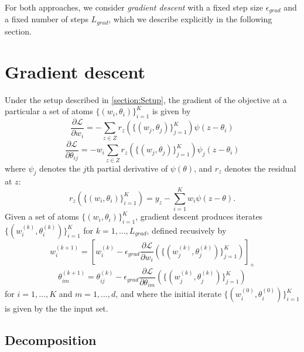 \documentclass[11pt]{article}
\begin{document}
For both approaches, we consider \emph{gradient descent} with a fixed
step size $\epsilon_{grad}$ and a fixed number of steps $L_{grad}$, which we
describe explicitly in the following section.

\section{Gradient descent}

Under the setup described in \ref{section:Setup},
the gradient of the objective at a particular a set of atoms $\{(w_i, \theta_i)\}_{i=1}^K$
is given by
\[
\frac{\partial \mathcal{L}}{\partial w_i} = -\sum_{z \in Z} r_z(\{(w_j, \theta_j)\}_{j=1}^K) \psi(z - \theta_i)
\]
\[
\frac{\partial \mathcal{L}}{\partial \theta_{ij}} = -w_i\sum_{z \in Z} r_z(\{(w_j, \theta_j)\}_{j=1}^K) \psi_j(z - \theta_i)
\]
where $\psi_j$ denotes the $j$th partial derivative of $\psi(\theta)$, and $r_z$ denotes the residual at $z$:
\[
r_z(\{(w_i, \theta_i)\}_{i=1}^K) = y_z - \sum_{i=1}^K w_i \psi(z - \theta).
\]
Given a set of atoms $\{(w_i, \theta_i)\}_{i=1}^K$, gradient descent produces iterates
$\{(w_i^{(k)}, \theta_i^{(k)})\}_{i=1}^K$ for $k = 1,\hdots, L_{grad}$,
defined recusively by
\[
w_i^{(k + 1)} = \left[w_i^{(k)} - \epsilon_{grad} \frac{\partial \mathcal{L}}{\partial w_i}(\{(w_j^{(k)}, \theta_j^{(k)})\}_{j=1}^K)\right]_+
\]
\[
\theta_{im}^{(k + 1)} = \theta_{ij}^{(k)} - \epsilon_{grad} \frac{\partial \mathcal{L}}{\partial \theta_{im}}(\{(w_j^{(k)}, \theta_j^{(k)})\}_{j=1}^K)
\]
for $i = 1,\hdots, K$ and $m=1,\hdots, d$, and where the initial iterate $\{(w_i^{(0)},
\theta_i^{(0)})\}_{i=1}^K$ is given by the the input set.

\subsection{Decomposition}
\end{document}
